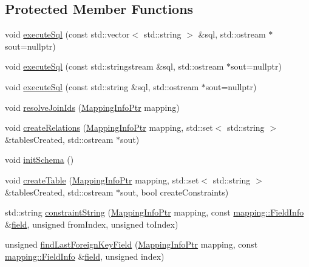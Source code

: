 \subsection*{Protected Member Functions}
\begin{DoxyCompactItemize}
\item 
void \hyperlink{classdbo_1_1connection_a20dfa44b7e33cc6c7e4608153ee858aa}{execute\+Sql} (const std\+::vector$<$ std\+::string $>$ \&sql, std\+::ostream $\ast$sout=nullptr)
\item 
void \hyperlink{classdbo_1_1connection_ac0145aacaaf4825b30f4d5658c3e1a99}{execute\+Sql} (const std\+::stringstream \&sql, std\+::ostream $\ast$sout=nullptr)
\item 
void \hyperlink{classdbo_1_1connection_a367170bd3ee09486b2b98dc744865122}{execute\+Sql} (const std\+::string \&sql, std\+::ostream $\ast$sout=nullptr)
\item 
void \hyperlink{classdbo_1_1connection_a5b21d06d9dbd4d26c0e45f3e9d8d858e}{resolve\+Join\+Ids} (\hyperlink{classdbo_1_1connection_acca03a784c87ffb1ec7bdf33f526dff5}{Mapping\+Info\+Ptr} mapping)
\item 
void \hyperlink{classdbo_1_1connection_a4ff08bfe57ea4e7f57ad18882da3318b}{create\+Relations} (\hyperlink{classdbo_1_1connection_acca03a784c87ffb1ec7bdf33f526dff5}{Mapping\+Info\+Ptr} mapping, std\+::set$<$ std\+::string $>$ \&tables\+Created, std\+::ostream $\ast$sout)
\item 
void \hyperlink{classdbo_1_1connection_a6e2ae3d9b23274bdf55dd1b703cce598}{init\+Schema} ()
\item 
void \hyperlink{classdbo_1_1connection_aab0c16df3bda31c2efbf9ee6a4ef8a60}{create\+Table} (\hyperlink{classdbo_1_1connection_acca03a784c87ffb1ec7bdf33f526dff5}{Mapping\+Info\+Ptr} mapping, std\+::set$<$ std\+::string $>$ \&tables\+Created, std\+::ostream $\ast$sout, bool create\+Constraints)
\item 
std\+::string \hyperlink{classdbo_1_1connection_a062d5ba43ddd69a9ba8efa4141df2b8b}{constraint\+String} (\hyperlink{classdbo_1_1connection_acca03a784c87ffb1ec7bdf33f526dff5}{Mapping\+Info\+Ptr} mapping, const \hyperlink{classdbo_1_1mapping_1_1_field_info}{mapping\+::\+Field\+Info} \&\hyperlink{namespacedbo_ad1f50f02cb050acf946807959252a93f}{field}, unsigned from\+Index, unsigned to\+Index)
\item 
unsigned \hyperlink{classdbo_1_1connection_ab7e69a0ef59496131688eebdedba1827}{find\+Last\+Foreign\+Key\+Field} (\hyperlink{classdbo_1_1connection_acca03a784c87ffb1ec7bdf33f526dff5}{Mapping\+Info\+Ptr} mapping, const \hyperlink{classdbo_1_1mapping_1_1_field_info}{mapping\+::\+Field\+Info} \&\hyperlink{namespacedbo_ad1f50f02cb050acf946807959252a93f}{field}, unsigned index)

\end{DoxyCompactItemize}
